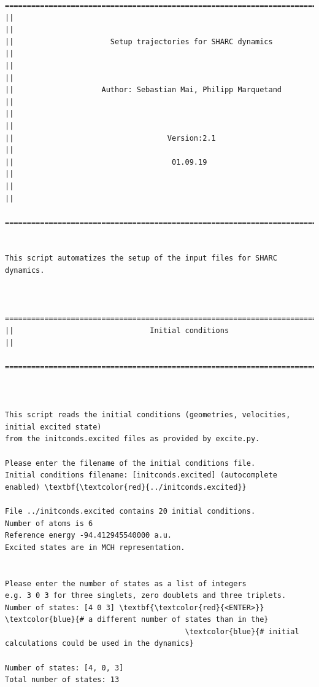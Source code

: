 \documentclass[a4paper,11pt,DIV=15,openany]{scrbook}
\begin{document}
\begin{oframed}
\footnotesize\begin{Verbatim}[commandchars=\\\{\}]
  ================================================================================
||                                                                                ||
||                      Setup trajectories for SHARC dynamics                     ||
||                                                                                ||
||                    Author: Sebastian Mai, Philipp Marquetand                   ||
||                                                                                ||
||                                   Version:2.1                                  ||
||                                    01.09.19                                    ||
||                                                                                ||
  ================================================================================


This script automatizes the setup of the input files for SHARC dynamics.
  

  ================================================================================
||                               Initial conditions                               ||
  ================================================================================



This script reads the initial conditions (geometries, velocities, initial excited state)
from the initconds.excited files as provided by excite.py.

Please enter the filename of the initial conditions file.
Initial conditions filename: [initconds.excited] (autocomplete enabled) \textbf{\textcolor{red}{../initconds.excited}}

File ../initconds.excited contains 20 initial conditions.
Number of atoms is 6
Reference energy -94.412945540000 a.u.
Excited states are in MCH representation.


Please enter the number of states as a list of integers
e.g. 3 0 3 for three singlets, zero doublets and three triplets.
Number of states: [4 0 3] \textbf{\textcolor{red}{<ENTER>}}        \textcolor{blue}{# a different number of states than in the}
                                         \textcolor{blue}{# initial calculations could be used in the dynamics}

Number of states: [4, 0, 3]
Total number of states: 13


\end{Verbatim}
\end{oframed}
\end{document}
